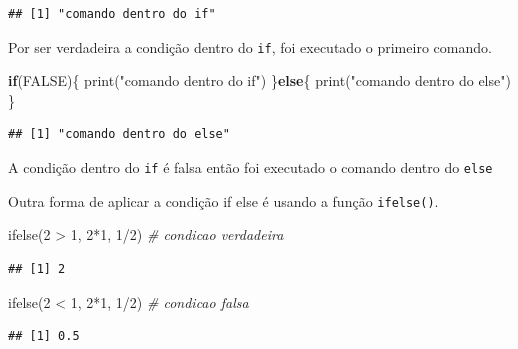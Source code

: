 \documentclass[
]{book}
\newenvironment{Shaded}{\begin{snugshade}}{\end{snugshade}}
\newcommand{\CommentTok}[1]{\textcolor[rgb]{0.56,0.35,0.01}{\textit{#1}}}
\newcommand{\ConstantTok}[1]{\textcolor[rgb]{0.00,0.00,0.00}{#1}}
\newcommand{\ControlFlowTok}[1]{\textcolor[rgb]{0.13,0.29,0.53}{\textbf{#1}}}
\newcommand{\DecValTok}[1]{\textcolor[rgb]{0.00,0.00,0.81}{#1}}
\newcommand{\FunctionTok}[1]{\textcolor[rgb]{0.00,0.00,0.00}{#1}}
\newcommand{\NormalTok}[1]{#1}
\newcommand{\SpecialCharTok}[1]{\textcolor[rgb]{0.00,0.00,0.00}{#1}}
\newcommand{\StringTok}[1]{\textcolor[rgb]{0.31,0.60,0.02}{#1}}
\theoremstyle{definition}
\theoremstyle{definition}
\theoremstyle{definition}
\theoremstyle{definition}
\theoremstyle{remark}
\begin{document}
\begin{verbatim}
## [1] "comando dentro do if"
\end{verbatim}

Por ser verdadeira a condição dentro do \texttt{if}, foi executado o primeiro comando.

\begin{Shaded}
\begin{Highlighting}[]
\ControlFlowTok{if}\NormalTok{(}\ConstantTok{FALSE}\NormalTok{)\{}
  \FunctionTok{print}\NormalTok{(}\StringTok{"comando dentro do if"}\NormalTok{)}
\NormalTok{\}}\ControlFlowTok{else}\NormalTok{\{}
  \FunctionTok{print}\NormalTok{(}\StringTok{"comando dentro do else"}\NormalTok{)}
\NormalTok{\}}
\end{Highlighting}
\end{Shaded}

\begin{verbatim}
## [1] "comando dentro do else"
\end{verbatim}

A condição dentro do \texttt{if} é falsa então foi executado o comando dentro do \texttt{else}

Outra forma de aplicar a condição if else é usando a função \texttt{ifelse()}.

\begin{Shaded}
\begin{Highlighting}[]
\FunctionTok{ifelse}\NormalTok{(}\DecValTok{2} \SpecialCharTok{\textgreater{}} \DecValTok{1}\NormalTok{, }\DecValTok{2}\SpecialCharTok{*}\DecValTok{1}\NormalTok{, }\DecValTok{1}\SpecialCharTok{/}\DecValTok{2}\NormalTok{) }\CommentTok{\# condicao verdadeira}
\end{Highlighting}
\end{Shaded}

\begin{verbatim}
## [1] 2
\end{verbatim}

\begin{Shaded}
\begin{Highlighting}[]
\FunctionTok{ifelse}\NormalTok{(}\DecValTok{2} \SpecialCharTok{\textless{}} \DecValTok{1}\NormalTok{, }\DecValTok{2}\SpecialCharTok{*}\DecValTok{1}\NormalTok{, }\DecValTok{1}\SpecialCharTok{/}\DecValTok{2}\NormalTok{) }\CommentTok{\# condicao falsa}
\end{Highlighting}
\end{Shaded}

\begin{verbatim}
## [1] 0.5
\end{verbatim}
\end{document}

